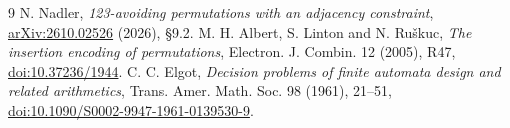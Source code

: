 \documentclass[11pt]{article}
\begin{document}
\begin{thebibliography}{9}
 N. Nadler, \emph{123-avoiding permutations with an adjacency constraint}, \href{https://arxiv.org/abs/2610.02526}{arXiv:2610.02526} (2026), \S9.2.
 M. H. Albert, S. Linton and N. Ru\v skuc, \emph{The insertion encoding of permutations}, Electron. J. Combin. 12 (2005), R47, \href{https://doi.org/10.37236/1944}{doi:10.37236/1944}.
 C. C. Elgot, \emph{Decision problems of finite automata design and related arithmetics}, Trans. Amer. Math. Soc. 98 (1961), 21--51, \href{https://doi.org/10.1090/S0002-9947-1961-0139530-9}{doi:10.1090/S0002-9947-1961-0139530-9}.
\end{thebibliography}
\end{document}

